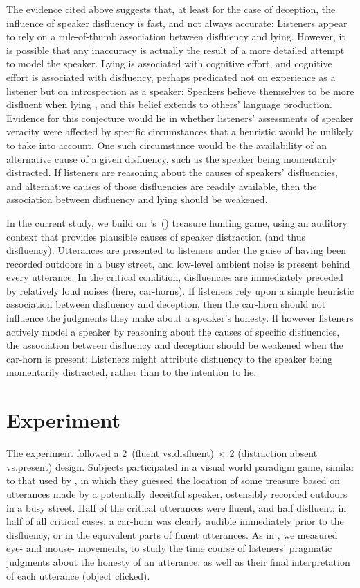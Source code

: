 \documentclass[a4paper,man,natbib]{apa6}
\newcommand*{\citegen}[1]{\citeauthor{#1}'s~(\citeyear{#1})}
\begin{document}
The evidence cited above suggests that, at least for the case of deception, the influence of speaker disfluency is fast, and not always accurate: 
Listeners appear to rely on a rule-of-thumb association between disfluency and lying.
However, it is possible that any inaccuracy is actually the result of a more detailed attempt to model the speaker.
Lying is associated with cognitive effort, and cognitive effort is associated with disfluency, perhaps predicated not on experience as a listener but on introspection as a speaker:
Speakers believe themselves to be more disfluent when lying \citep{Zuckerman1981}, and this belief extends to others' language production.
Evidence for this conjecture would lie in whether listeners' assessments of speaker veracity were affected by specific circumstances that a heuristic would be unlikely to take into account.
One such circumstance would be the availability of an alternative cause of a given disfluency, such as the speaker being momentarily distracted.
If listeners are reasoning about the causes of speakers' disfluencies, and alternative causes of those disfluencies are readily available, then the association between disfluency and lying should be weakened.


In the current study, we build on \citegen{Loy2016} treasure hunting game, using an auditory context that provides plausible causes of speaker distraction (and thus disfluency).
Utterances are presented to listeners under the guise of having been recorded outdoors in a busy street, and low-level ambient noise is present behind every utterance.
In the critical condition, disfluencies are immediately preceded by relatively loud noises (here, car-horns).
If listeners rely upon a simple heuristic association between disfluency and deception, then the car-horn should not influence the judgments they make about a speaker's honesty.
If however listeners actively model a speaker by reasoning about the causes of specific disfluencies, the association between disfluency and deception should be weakened when the car-horn is present:
Listeners might attribute disfluency to the speaker being momentarily distracted, rather than to the intention to lie.


\section{Experiment}

The experiment followed a 2~(fluent vs.\@ disfluent) $\times$~2 (distraction absent vs.\@ present) design.
Subjects participated in a visual world paradigm game, similar to that used by \citet{Loy2016}, in which they guessed the location of some treasure based on utterances made by a potentially deceitful speaker, ostensibly recorded outdoors in a busy street.
Half of the critical utterances were fluent, and half disfluent; in half of all critical cases, a car-horn was clearly audible immediately prior to the disfluency, or in the equivalent parts of fluent utterances.
As in \citet{Loy2016}, we measured eye- and mouse- movements, to study the time course of listeners' pragmatic judgments about the honesty of an utterance, as well as their final interpretation of each utterance (object clicked).
\end{document}
